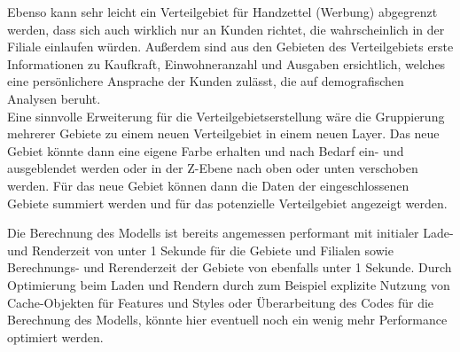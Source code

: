 Ebenso kann sehr leicht ein Verteilgebiet für Handzettel (Werbung) abgegrenzt werden, dass sich auch wirklich nur an Kunden richtet, die wahrscheinlich in der Filiale einlaufen würden.
Außerdem sind aus den Gebieten des Verteilgebiets erste Informationen zu Kaufkraft, Einwohneranzahl und Ausgaben ersichtlich, welches eine persönlichere Ansprache der Kunden zulässt, die auf demografischen Analysen beruht.\\
Eine sinnvolle Erweiterung für die Verteilgebietserstellung wäre die Gruppierung mehrerer Gebiete zu einem neuen Verteilgebiet in einem neuen Layer.
Das neue Gebiet könnte dann eine eigene Farbe erhalten und nach Bedarf ein- und ausgeblendet werden oder in der Z-Ebene nach oben oder unten verschoben werden.
Für das neue Gebiet können dann die Daten der eingeschlossenen Gebiete summiert werden und für das potenzielle Verteilgebiet angezeigt werden.

Die Berechnung des Modells ist bereits angemessen performant mit initialer Lade- und Renderzeit von unter 1 Sekunde für die Gebiete und Filialen sowie Berechnungs- und Rerenderzeit der Gebiete von ebenfalls unter 1 Sekunde.
Durch Optimierung beim Laden und Rendern durch zum Beispiel explizite Nutzung von Cache-Objekten für Features und Styles oder Überarbeitung des Codes für die Berechnung des Modells, könnte hier eventuell noch ein wenig mehr Performance optimiert werden.

